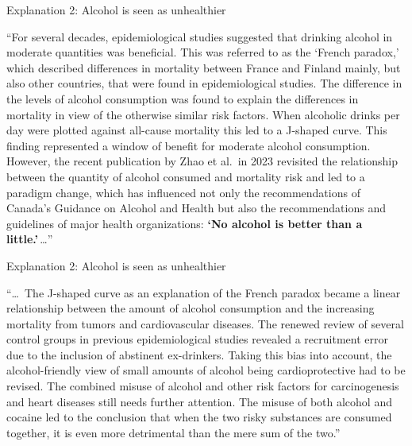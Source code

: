 \documentclass[aspectratio=169,11pt]{beamer}
\begin{document}
\begin{frame}{Explanation 2: Alcohol is seen as unhealthier}
  \vspace{0.3em}
  \begin{textquote}[fontupper=\itshape\footnotesize]
    ``For several decades, epidemiological studies suggested that drinking alcohol in moderate quantities was beneficial. This was referred to as the `French paradox,' which described differences in mortality between France and Finland mainly, but also other countries, that were found in epidemiological studies. The difference in the levels of alcohol consumption was found to explain the differences in mortality in view of the otherwise similar risk factors. When alcoholic drinks per day were plotted against all-cause mortality this led to a J-shaped curve. This finding represented a window of benefit for moderate alcohol consumption. However, the recent publication by Zhao et al.\ in 2023 revisited the relationship between the quantity of alcohol consumed and mortality risk and led to a paradigm change, which has influenced not only the recommendations of Canada's Guidance on Alcohol and Health but also the recommendations and guidelines of major health organizations: \textbf{`No alcohol is better than a little.'}\,\ldots''
  \end{textquote}
\end{frame}

\begin{frame}{Explanation 2: Alcohol is seen as unhealthier}
  \vspace{0.3em}
  \begin{textquote}[fontupper=\itshape\footnotesize]
    ``\ldots\ The J-shaped curve as an explanation of the French paradox became a linear relationship between the amount of alcohol consumption and the increasing mortality from tumors and cardiovascular diseases. The renewed review of several control groups in previous epidemiological studies revealed a recruitment error due to the inclusion of abstinent ex-drinkers. Taking this bias into account, the alcohol-friendly view of small amounts of alcohol being cardioprotective had to be revised. The combined misuse of alcohol and other risk factors for carcinogenesis and heart diseases still needs further attention. The misuse of both alcohol and cocaine led to the conclusion that when the two risky substances are consumed together, it is even more detrimental than the mere sum of the two.''
  \end{textquote}
\end{frame}
\end{document}
